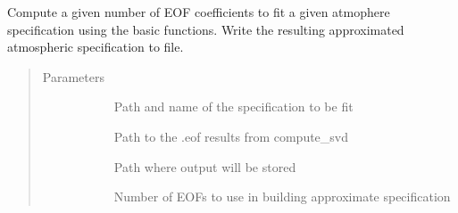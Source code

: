 \documentclass[letterpaper,10pt,english]{sphinxmanual}
\begin{document}
\begin{fulllineitems}
\label{\detokenize{stochprop.eofs:stochprop.eofs.fit_atmo}}
Compute a given number of EOF coefficients to fit a given
atmophere specification using the basic functions.  Write
the resulting approximated atmospheric specification to
file.
\begin{quote}\begin{description}
\item[{Parameters}] \leavevmode\begin{description}
\item[{}] \leavevmode
Path and name of the specification to be fit

\item[{}] \leavevmode
Path to the .eof results from compute\_svd

\item[{}] \leavevmode
Path where output will be stored

\item[{}] \leavevmode
Number of EOFs to use in building approximate specification

\end{description}

\end{description}\end{quote}

\end{fulllineitems}

\end{document}
